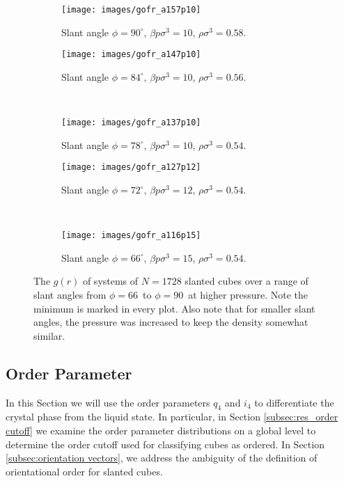 \documentclass[thesis]{subfiles}
\begin{document}
\begin{figure}[H]
	\centering
	\begin{subfigure}{0.49\textwidth}
	\texttt{[image: images/gofr\_a157p10]}
	\caption{Slant angle $\phi = 90^\circ$, $\beta p \sigma^3 = 10$, $\rho \sigma^3 = 0.58$. }
	\end{subfigure}
	\begin{subfigure}{0.49\textwidth}
		\texttt{[image: images/gofr\_a147p10]}
		\caption{Slant angle $\phi = 84^\circ$, $\beta p \sigma^3 = 10$, $\rho \sigma^3 = 0.56$. }
	\end{subfigure}
\\\vspace{10pt}
	\begin{subfigure}{0.49\textwidth}
		\texttt{[image: images/gofr\_a137p10]}
		\caption{Slant angle $\phi = 78^\circ$, $\beta p \sigma^3 = 10$, $\rho \sigma^3 = 0.54$. }
	\end{subfigure}
	\begin{subfigure}{0.49\textwidth}
		\texttt{[image: images/gofr\_a127p12]}
		\caption{Slant angle $\phi = 72^\circ$, $\beta p \sigma^3 = 12$, $\rho \sigma^3 = 0.54$. }
	\end{subfigure}
\\\vspace{10pt}
	\begin{subfigure}{0.49\textwidth}
		\texttt{[image: images/gofr\_a116p15]}
		\caption{Slant angle $\phi = 66^\circ$, $\beta p \sigma^3 = 15$, $\rho \sigma^3 = 0.54$. }
	\end{subfigure}
	
	\caption{The $g(r)$ of systems of $N = 1728$ slanted cubes over a range of slant angles from $\phi = 66$\degr\ to $\phi = 90$\degr\ at higher pressure. Note the minimum is marked in every plot. Also note that for smaller slant angles, the pressure was increased to keep the density somewhat similar.}\label{fig:gofr_Xtal}
\end{figure}

\subsection{Order Parameter} \label{subsec:order}

In this Section we will use the order parameters $q_4$ and $i_4$ to differentiate the crystal phase from the liquid state. In particular, in Section \ref{subsec:res_order cutoff} we examine the order parameter distributions on a global level to determine the order cutoff used for classifying cubes as ordered. In Section \ref{subsec:orientation vectors}, we address the ambiguity of the definition of orientational order for slanted cubes.
\end{document}
